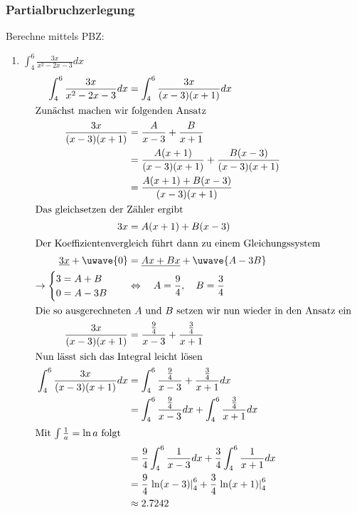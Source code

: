 \documentclass[11pt, a4paper]{article}
\begin{document}
\subsubsection{Partialbruchzerlegung}
Berechne mittels PBZ:
\begin{enumerate}
	\item $\displaystyle \int_4^6 \frac{3x}{x^2 - 2x - 3} dx$ %
	\begin{align*}
		\int_4^6 \frac{3x}{x^2 - 2x - 3} dx &= \int_4^6 \frac{3x}{(x-3)(x+1)} dx \\
		\intertext{Zunächst machen wir folgenden Ansatz}
		\frac{3x}{(x-3)(x+1)} &= \frac{A}{x-3} + \frac{B}{x+1} \label{eq:pbz-ansatz} \\
		&= \frac{A (x+1)}{(x-3)(x+1)} + \frac{B (x-3)}{(x-3)(x+1)} \\
		&= \frac{A (x+1) + B (x-3)}{(x-3)(x+1)} \\
		\intertext{Das gleichsetzen der Zähler ergibt}
		3x &= A (x+1) + B (x-3) \\
		\intertext{Der Koeffizientenvergleich führt dann zu einem Gleichungssystem}
		\underline{3x} + \uwave{0} &= \underline{Ax + Bx} + \uwave{A -3B} \\
		\rightarrow \begin{cases}
			3 = A + B \\
			0 = A - 3B
		\end{cases}
		\quad &\Leftrightarrow \quad A = \frac{9}{4}, \quad B = \frac{3}{4} \\
		\intertext{Die so ausgerechneten $A$ und $B$ setzen wir nun wieder in den Ansatz ein}
		\frac{3x}{(x-3)(x+1)} &= \frac{\frac{9}{4}}{x-3} + \frac{\frac{3}{4}}{x+1} \\
		\intertext{Nun lässt sich das Integral leicht lösen}
		\int_4^6 \frac{3x}{(x-3)(x+1)} dx &= \int_4^6 \frac{\frac{9}{4}}{x-3} + \frac{\frac{3}{4}}{x+1} dx \\
		&= \int_4^6 \frac{\frac{9}{4}}{x-3} dx + \int_4^6 \frac{\frac{3}{4}}{x+1} dx \\
		\intertext{Mit $\int \frac{1}{a} = \ln{a}$ folgt}
		&= \frac{9}{4} \int_4^6 \frac{1}{x-3} dx + \frac{3}{4} \int_4^6 \frac{1}{x+1} dx \\
		&= \frac{9}{4} \left. \ln(x-3) \right|_4^6 + \frac{3}{4} \left. \ln(x+1) \right|_4^6 \\
		&\approx 2.7242
	\end{align*}
	

\end{enumerate}
\end{document}
